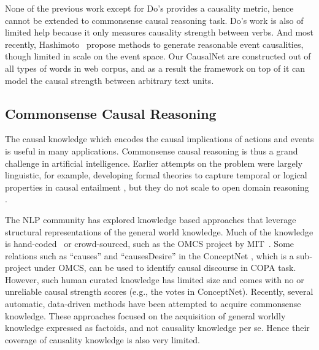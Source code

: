 None of the previous work except for Do's provides a
causality metric, hence cannot be extended to commonsense causal
reasoning task. Do's work is also of limited help because it only
measures causality strength between verbs.
And most recently, Hashimoto~\cite{hashimoto2015generating} propose
methods to generate reasonable event causalities,
though limited in scale on the event space.  Our CausalNet are
constructed out of all types of words in web corpus, and as a result
the framework on top of it can model the causal strength between
arbitrary text units.

\subsection{Commonsense Causal Reasoning}
The causal knowledge which encodes the causal implications of
actions and events is useful in many applications.
Commonsense causal reasoning is thus a
grand challenge in artificial intelligence. Earlier attempts on the
problem were largely linguistic, for example, developing formal
theories to capture temporal or logical properties in causal
entailment \cite{LascaridesAO92,lascarides:asher:1993a}, but
they do not scale to %
open domain reasoning .

The NLP community has explored knowledge based approaches
that leverage structural representations of the general world knowledge.
Much of the knowledge is hand-coded~\cite{lenat1995cyc}
or crowd-sourced, such as the OMCS project by MIT~\cite{singh2002open}.
Some relations such as ``causes'' and
``causesDesire'' in the ConceptNet \cite{liu2004commonsense},
which is a sub-project under OMCS, can be used to identify causal
discourse in COPA task.
However, such human curated knowledge
has limited size and comes with no or unreliable causal strength
scores (e.g., the votes in ConceptNet).
Recently, several automatic, data-driven methods have
been attempted to acquire commonsense
knowledge\cite{schubert2002can,gordon2010learning,gordon2010mining,akbikweltmodell}.
These approaches focused on the acquisition of general
worldly knowledge expressed as factoids, and not causality knowledge
per se. Hence their coverage of causality knowledge is also very limited.

